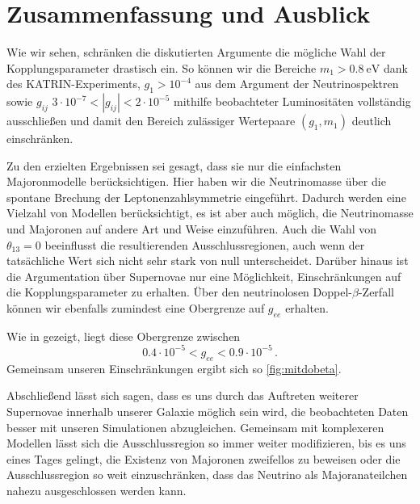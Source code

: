 \chapter{Zusammenfassung und Ausblick}

Wie wir sehen, schränken die diskutierten Argumente die mögliche Wahl der Kopplungsparameter drastisch ein.
So können wir die Bereiche $m_1 > \SI{0.8}{\eV}$ dank des KATRIN-Experiments, $g_1 > 10^{-4}$ aus dem Argument der Neutrinospektren sowie $g_{i j}$ $3 \cdot 10^{-7} < |g_{i j}| < 2 \cdot 10^{-5}$
mithilfe beobachteter Luminositäten vollständig ausschließen und damit den Bereich zulässiger Wertepaare
$(g_1,m_1)$ deutlich einschränken.

Zu den erzielten Ergebnissen sei gesagt, dass sie nur die einfachsten Majoronmodelle berücksichtigen.
Hier haben wir die Neutrinomasse über die spontane Brechung der Leptonenzahlsymmetrie eingeführt.
Dadurch werden eine Vielzahl von Modellen berücksichtigt, es ist aber auch möglich, die Neutrinomasse und Majoronen auf andere Art und Weise einzuführen.
Auch die Wahl von $\theta_{1 3} = 0$ beeinflusst die resultierenden Ausschlussregionen, auch wenn der tatsächliche Wert sich nicht sehr stark von null unterscheidet.
Darüber hinaus ist die Argumentation über Supernovae nur eine Möglichkeit, Einschränkungen auf die Kopplungsparameter zu erhalten.
Über den neutrinolosen Doppel-$\beta$-Zerfall können wir ebenfalls zumindest eine Obergrenze auf $g_{ee}$ erhalten.

Wie in \cite{hauhau} gezeigt, liegt diese Obergrenze zwischen
\begin{equation}
    \num{0.4} \cdot 10^{-5} < g_{ee} < \num{0.9} \cdot 10^{-5} \,.
    \label{eq:g_eedoppelbeta}
\end{equation} 
Gemeinsam unseren Einschränkungen ergibt sich so \autoref{fig:mitdobeta}.

Abschließend lässt sich sagen, dass es uns durch das Auftreten weiterer Supernovae innerhalb unserer Galaxie möglich sein wird, die beobachteten Daten besser mit unseren Simulationen abzugleichen.
Gemeinsam mit komplexeren Modellen lässt sich die Ausschlussregion so immer weiter modifizieren, bis es uns eines Tages gelingt, die Existenz von Majoronen zweifellos zu beweisen oder die
Ausschlussregion so weit einzuschränken, dass das Neutrino als Majoranateilchen nahezu ausgeschlossen werden kann.



